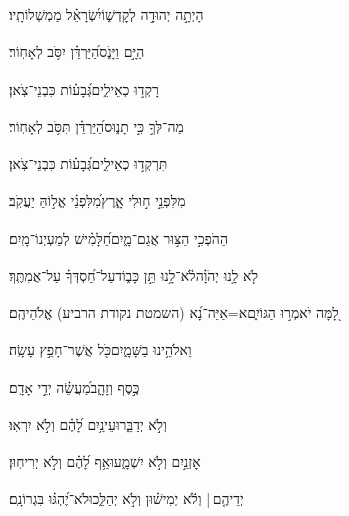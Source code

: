 \documentclass[12pt]{article}
\newcommand{\loc}[1]{\textsuperscript{\locf{#1}}}
\begin{document}
{\loc{ ב}~}‏הָיְתָ֣ה יְהוּדָ֣ה לְקׇדְשׁ֑וֹ{\hfill}יִ֝שְׂרָאֵ֗ל מַמְשְׁלוֹתָֽיו׃\par

{\loc{ ג}~}‏הַיָּ֣ם  וַיָּנֹ֑ס{\hfill}הַ֝יַּרְדֵּ֗ן יִסֹּ֥ב לְאָחֽוֹר׃\par

{\loc{ ד}~}‏ רָקְד֣וּ כְאֵילִ֑ים{\hfill}גְּ֝בָע֗וֹת כִּבְנֵי־צֹֽאן׃\par

{\loc{ ה}~}‏מַה־לְּךָ֣  כִּ֣י תָנ֑וּס{\hfill}הַ֝יַּרְדֵּ֗ן תִּסֹּ֥ב לְאָחֽוֹר׃\par

{\loc{ ו}~}‏ תִּרְקְד֣וּ כְאֵילִ֑ים{\hfill}גְּ֝בָע֗וֹת כִּבְנֵי־צֹֽאן׃\par

{\loc{ ז}~}‏מִלִּפְנֵ֣י  ח֣וּלִי אָ֑רֶץ{\hfill}מִ֝לִּפְנֵ֗י אֱל֣וֹהַּ יַעֲקֹֽב׃\par

{\loc{ ח}~}‏הַהֹפְכִ֣י הַצּ֣וּר אֲגַם־מָ֑יִם{\hfill}חַ֝לָּמִ֗ישׁ לְמַעְיְנוֹ־מָֽיִם׃\par\pend
\ledpb
\pstart[\subsection*{\textcolor{red}{פרק קטו}}]\label{פרק קטו}
{\loc{ א}~}‏לֹ֤א לָ֥נוּ יְהֹוָ֗ה{\hfill}לֹ֫א־לָ֥נוּ\newline\hspace*{.5em} תֵּ֣ן כָּב֑וֹד{\hfill}עַל־חַ֝סְדְּךָ֗ עַל־אֲמִתֶּֽךָ׃\par

{\loc{ ב}~}‏לָ֭מָּה יֹאמְר֣וּ הַגּוֹיִ֑ם{\hfill}א=אַיֵּה־נָ֝א (השמטת נקודת הרביע) אֱלֹהֵיהֶֽם׃\par

{\loc{ ג}~}‏וֵאלֹהֵ֥ינוּ בַשָּׁמָ֑יִם{\hfill}כֹּ֖ל אֲשֶׁר־חָפֵ֣ץ עָשָֽׂה׃\par

{\loc{ ד}~}‏ כֶּ֣סֶף וְזָהָ֑ב{\hfill}מַ֝עֲשֵׂ֗ה יְדֵ֣י אָדָֽם׃\par

{\loc{ ה}~}‏ וְלֹ֣א יְדַבֵּ֑רוּ{\hfill}עֵינַ֥יִם לָ֝הֶ֗ם וְלֹ֣א יִרְאֽוּ׃\par

{\loc{ ו}~}‏אׇזְנַ֣יִם  וְלֹ֣א יִשְׁמָ֑עוּ{\hfill}אַ֥ף לָ֝הֶ֗ם וְלֹ֣א יְרִיחֽוּן׃\par

{\loc{ ז}~}‏יְדֵיהֶ֤ם | {\hfill}וְלֹ֬א יְמִישׁ֗וּן\newline\hspace*{.5em} וְלֹ֣א יְהַלֵּ֑כוּ{\hfill}לֹא־יֶ֝הְגּ֗וּ בִּגְרוֹנָֽם׃\par
\end{document}
